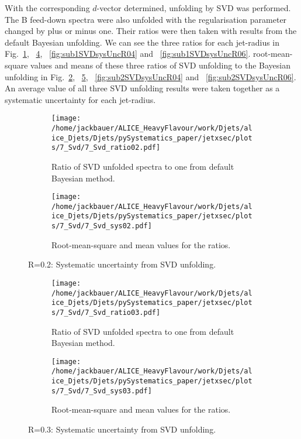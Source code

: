 With the corresponding $d$-vector determined, unfolding by SVD was performed. The B feed-down spectra were also unfolded with the regularisation parameter changed by plus or minus one. Their ratios were then taken with results from the default Bayesian unfolding. We can see the three ratios for each jet-radius in Fig.~\ref{fig:sub1SVDsysUncR02}, ~\ref{fig:sub1SVDsysUncR03}, ~\ref{fig:sub1SVDsysUncR04} and ~\ref{fig:sub1SVDsysUncR06}. root-mean-square values and means of these three ratios of SVD unfolding to the Bayesian unfolding in Fig.~\ref{fig:sub2SVDsysUncR02}, ~\ref{fig:sub2SVDsysUncR03}, ~\ref{fig:sub2SVDsysUncR04} and ~\ref{fig:sub2SVDsysUncR06}. An average value of all three SVD unfolding results were taken together as a systematic uncertainty for each jet-radius.


\begin{figure}
\centering
\begin{subfigure}{.5\textwidth}
  \centering
  \texttt{[image: /home/jackbauer/ALICE\_HeavyFlavour/work/Djets/alice\_Djets/Djets/pySystematics\_paper/jetxsec/plots/7\_Svd/7\_Svd\_ratio02.pdf]}
  \caption{Ratio of SVD unfolded spectra to one from default Bayesian method.}
  \label{fig:sub1SVDsysUncR02}
\end{subfigure}%
\begin{subfigure}{.5\textwidth}
  \centering
  \texttt{[image: /home/jackbauer/ALICE\_HeavyFlavour/work/Djets/alice\_Djets/Djets/pySystematics\_paper/jetxsec/plots/7\_Svd/7\_Svd\_sys02.pdf]}
  \caption{Root-mean-square and mean values for the ratios.}
  \label{fig:sub2SVDsysUncR02}
\end{subfigure}
\caption{R=0.2: Systematic uncertainty from SVD unfolding.}
  \label{fig:SVDsysUncR02}
\end{figure}

\begin{figure}
\centering
\begin{subfigure}{.5\textwidth}
  \centering
  \texttt{[image: /home/jackbauer/ALICE\_HeavyFlavour/work/Djets/alice\_Djets/Djets/pySystematics\_paper/jetxsec/plots/7\_Svd/7\_Svd\_ratio03.pdf]}
  \caption{Ratio of SVD unfolded spectra to one from default Bayesian method.}
  \label{fig:sub1SVDsysUncR03}
\end{subfigure}%
\begin{subfigure}{.5\textwidth}
  \centering
  \texttt{[image: /home/jackbauer/ALICE\_HeavyFlavour/work/Djets/alice\_Djets/Djets/pySystematics\_paper/jetxsec/plots/7\_Svd/7\_Svd\_sys03.pdf]}
  \caption{Root-mean-square and mean values for the ratios.}
  \label{fig:sub2SVDsysUncR03}
\end{subfigure}
\caption{R=0.3: Systematic uncertainty from SVD unfolding.}
  \label{fig:SVDsysUncR03}
\end{figure}


